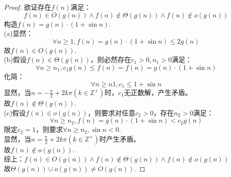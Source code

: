 \begin{proof}
    欲证存在$f(n)$满足：
    $$f(n) \in O(g(n)) \wedge f(n) \notin \Theta(g(n)) \wedge f(n) \notin o(g(n))$$
    构造$f(n) = g(n) \cdot (1 + \sin n)$.\\

    (a)显然：
    $$\forall n \ge 1, f(n) = g(n) \cdot (1 + \sin n) \le 2g(n)$$
    故$f(n) \in O(g(n))$.\\

    (b)假设$f(n) \in \Theta(g(n))$，则必然存在$c_1>0,n_1>0$满足：
    $$\forall n \ge n_1, c_1g(n) \le f(n) = f(n) = g(n) \cdot (1 + \sin n) $$
    化简：
    $$\forall n \ge n1, c_1 \le 1 + \sin n$$
    显然，当$n= - \frac{\pi}{2} + 2k\pi(k \in \mathbb Z^+)$时，$c_1$无正数解，产生矛盾。\\
    故$f(n) \notin \Theta(g(n))$.\\

    (c)假设$f(n) \in o(g(n))$，则要求对任意$c_2>0$，存在$n_2>0$满足：
    $$\forall n \ge n_2, f(n) = g(n) \cdot (1 + \sin n) < c_2g(n)$$
    限定$c_2=1$，则要求$\forall n \ge n_2, \sin n < 0$.\\
    显然，当$n=\frac{\pi}{2} + 2k\pi(k \in \mathbb Z^+)$时产生矛盾。\\
    故$f(n) \notin o(g(n))$.\\
    \bigskip
    综上：$f(n) \in O(g(n)) \wedge f(n) \notin \Theta(g(n)) \wedge f(n) \notin o(g(n))$\\
    故$\Theta(g(n)) \cup o(g(n)) \neq O(g(n))$.

\end{proof}
